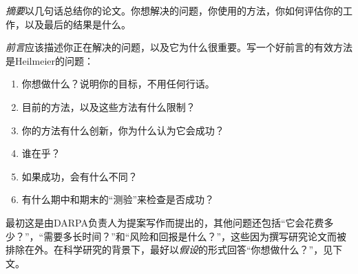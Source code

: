 

\emph{摘要}以几句话总结你的论文。你想解决的问题，你使用的方法，你如何评估你的工作，以及最后的结果是什么。

\emph{前言}应该描述你正在解决的问题，以及它为什么很重要。写一个好前言的有效方法是Heilmeier的问题：

\begin{enumerate}

\item 你想做什么？说明你的目标，不用任何行话。
\item 目前的方法，以及这些方法有什么限制？
\item 你的方法有什么创新，你为什么认为它会成功？
\item 谁在乎？
\item 如果成功，会有什么不同？
\item 有什么期中和期末的“测验”来检查是否成功？
\end{enumerate}


最初这是由DARPA负责人为提案写作而提出的，其他问题还包括“它会花费多少？”，“需要多长时间？”和“风险和回报是什么？”，这些因为撰写研究论文而被排除在外。在科学研究的背景下，最好以\emph{假设}的形式回答“你想做什么？”，见下文。

